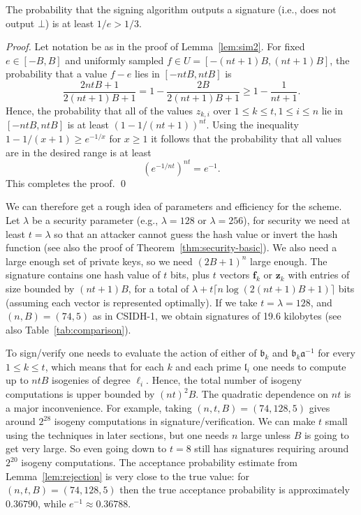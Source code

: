 \documentclass{llncs}
\renewcommand{\a}{\mathfrak{a}}
\renewcommand{\b}{\mathfrak{b}}
\renewcommand{\l}{\mathfrak{l}}
\newcommand{\f}{\mathbf{f}}
\newcommand{\z}{\mathbf{z}}
\begin{document}
\begin{lemma}\label{lem:rejection}
The probability that the signing algorithm outputs a signature (i.e., does not output $\bot$) is at least $1/e > 1/3$.
\end{lemma}

\begin{proof}
Let notation be as in the proof of Lemma~\ref{lem:sim2}.
For fixed $e \in [-B, B]$ and uniformly sampled $f \in U = [-(nt+1)B, (nt+1)B]$, the probability that a value $f-e$ lies in $[-ntB, ntB]$ is
\[
   \frac{2ntB + 1}{2(nt+1)B + 1}  = 1 - \frac{2B}{2(nt+1)B + 1} \ge 1 - \frac{1}{nt+1}.
\]
Hence, the probability that all of the values $z_{k,i}$ over $1 \le k \le t, 1 \le i \le n$ lie in $[-ntB, ntB]$ is at least $(1 - 1/(nt+1))^{nt}$.
Using the inequality $1 - 1/(x+1) \ge e^{-1/x}$ for $x \ge 1$ it follows that the probability that all values are in the desired range is at least
\[
   \left( e^{-1/nt} \right)^{nt} = e^{-1}.
\]
This completes the proof. \qed
\end{proof}





We can therefore get a rough idea of parameters and efficiency for the scheme.
Let $\lambda$ be a security parameter (e.g., $\lambda=128$ or $\lambda=256$), for security
we need at least $t=\lambda$ so that an attacker cannot guess the hash value or invert the hash function (see also the proof of Theorem~\ref{thm:security-basic}).
We also need a large enough set of private keys, so we need $(2B+1)^n$ large enough.
The signature contains one hash value of $t$ bits, plus $t$ vectors $\f_k$ or $\z_k$ with entries of size bounded by $(nt+1)B$, for a total of $\lambda + t\lceil n\log(2(nt+1)B + 1)\rceil$ bits (assuming each vector is represented optimally). If we take $t=\lambda=128$, and $(n,B)=(74,5)$ as in CSIDH-1, we obtain signatures of 19.6 kilobytes (see also Table~\ref{tab:comparison}).

To sign/verify one needs to evaluate the action of either of $\b_k$ and $\b_k\a^{-1}$ for every $1\le k\le t$,
which means that for each $k$ and each prime $\l_i$ one needs to compute up to $ntB$ isogenies of degree $\ell_i$.
Hence, the total number of isogeny computations is upper bounded by $(nt)^2 B$.
The quadratic dependence on $nt$ is a major inconvenience.
For example, taking $(n,t,B)=(74,128,5)$ gives around $2^{28}$ isogeny computations in signature/verification.
We can make $t$ small using the techniques in later sections, but one needs $n$ large unless $B$ is going to get very large. So even going down to $t=8$ still has signatures requiring around $2^{20}$ isogeny computations.
The acceptance probability estimate from Lemma~\ref{lem:rejection} is very close to the true value: for $(n,t,B)=(74,128,5)$ then the true acceptance probability is approximately $0.36790$, while $e^{-1} \approx 0.36788$.
\end{document}
